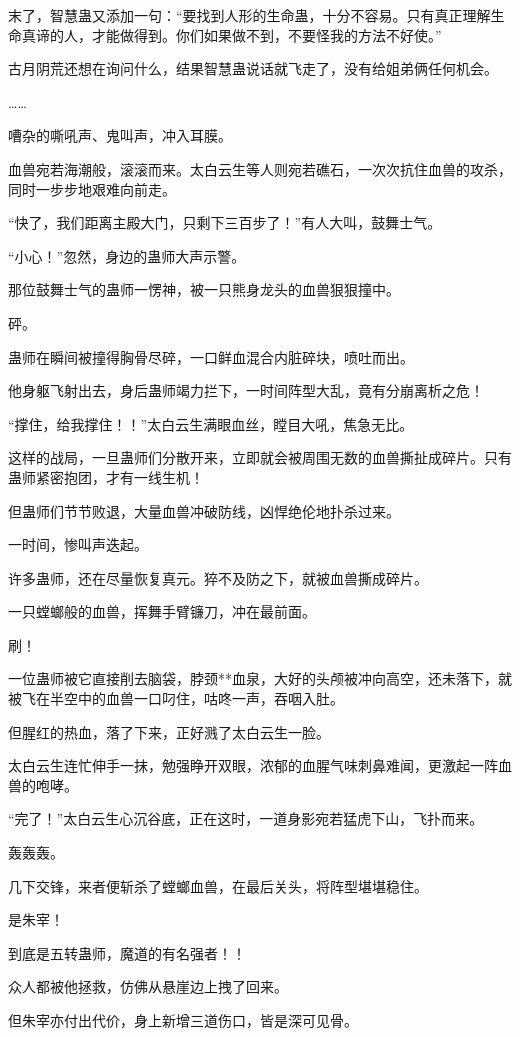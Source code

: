 \begin{this_body}
末了，智慧蛊又添加一句：“要找到人形的生命蛊，十分不容易。只有真正理解生命真谛的人，才能做得到。你们如果做不到，不要怪我的方法不好使。”

古月阴荒还想在询问什么，结果智慧蛊说话就飞走了，没有给姐弟俩任何机会。

……

嘈杂的嘶吼声、鬼叫声，冲入耳膜。

血兽宛若海潮般，滚滚而来。太白云生等人则宛若礁石，一次次抗住血兽的攻杀，同时一步步地艰难向前走。

“快了，我们距离主殿大门，只剩下三百步了！”有人大叫，鼓舞士气。

“小心！”忽然，身边的蛊师大声示警。

那位鼓舞士气的蛊师一愣神，被一只熊身龙头的血兽狠狠撞中。

砰。

蛊师在瞬间被撞得胸骨尽碎，一口鲜血混合内脏碎块，喷吐而出。

他身躯飞射出去，身后蛊师竭力拦下，一时间阵型大乱，竟有分崩离析之危！

“撑住，给我撑住！！”太白云生满眼血丝，瞠目大吼，焦急无比。

这样的战局，一旦蛊师们分散开来，立即就会被周围无数的血兽撕扯成碎片。只有蛊师紧密抱团，才有一线生机！

但蛊师们节节败退，大量血兽冲破防线，凶悍绝伦地扑杀过来。

一时间，惨叫声迭起。

许多蛊师，还在尽量恢复真元。猝不及防之下，就被血兽撕成碎片。

一只螳螂般的血兽，挥舞手臂镰刀，冲在最前面。

刷！

一位蛊师被它直接削去脑袋，脖颈**血泉，大好的头颅被冲向高空，还未落下，就被飞在半空中的血兽一口叼住，咕咚一声，吞咽入肚。

但腥红的热血，落了下来，正好溅了太白云生一脸。

太白云生连忙伸手一抹，勉强睁开双眼，浓郁的血腥气味刺鼻难闻，更激起一阵血兽的咆哮。

“完了！”太白云生心沉谷底，正在这时，一道身影宛若猛虎下山，飞扑而来。

轰轰轰。

几下交锋，来者便斩杀了螳螂血兽，在最后关头，将阵型堪堪稳住。

是朱宰！

到底是五转蛊师，魔道的有名强者！！

众人都被他拯救，仿佛从悬崖边上拽了回来。

但朱宰亦付出代价，身上新增三道伤口，皆是深可见骨。


\end{this_body}
